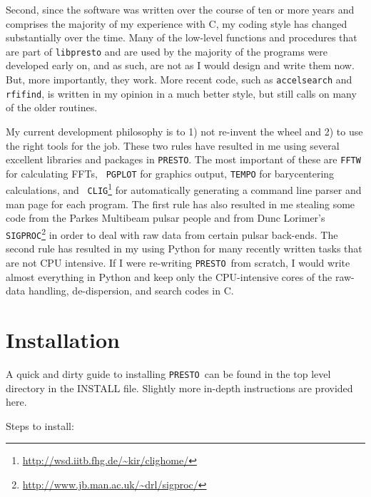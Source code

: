 \documentclass[11pt]{article}
\newcommand{\PRESTO}{{\tt PRESTO}}
\begin{document}
Second, since the software was written over the course of ten or more
years and comprises the majority of my experience with C, my coding
style has changed substantially over the time.  Many of the low-level
functions and procedures that are part of {\tt libpresto} and are used
by the majority of the programs were developed early on, and as such,
are not as I would design and write them now.  But, more importantly,
they work.  More recent code, such as {\tt accelsearch} and {\tt
  rfifind}, is written in my opinion in a much better style, but still
calls on many of the older routines.

My current development philosophy is to 1) not re-invent the wheel and
2) to use the right tools for the job.  These two rules have resulted
in me using several excellent libraries and packages in \PRESTO.  The
most important of these are {\tt FFTW} for calculating FFTs, {\tt
  PGPLOT} for graphics output, {\tt TEMPO} for barycentering
calculations, and {\tt
  CLIG}\footnote{\url{http://wsd.iitb.fhg.de/~kir/clighome/}} for
automatically generating a command line parser and man page for each
program.  The first rule has also resulted in me stealing some code
from the Parkes Multibeam pulsar people and from Dunc Lorimer's {\tt
  SIGPROC}\footnote{\url{http://www.jb.man.ac.uk/~drl/sigproc/}} in
order to deal with raw data from certain pulsar back-ends.  The second
rule has resulted in my using Python for many recently written tasks
that are not CPU intensive.  If I were re-writing \PRESTO\ from
scratch, I would write almost everything in Python and keep only the
CPU-intensive cores of the raw-data handling, de-dispersion, and
search codes in C.

\section{Installation}

A quick and dirty guide to installing \PRESTO\ can be found in the top
level directory in the INSTALL file.  Slightly more in-depth
instructions are provided here.

Steps to install:
\end{document}
